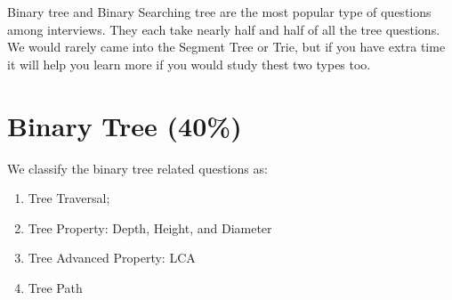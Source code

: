 \documentclass[../main.tex]{subfiles}
\begin{document}
Binary tree and Binary Searching tree are the most popular type of questions among interviews. They each take nearly half and half of all the tree questions. We would rarely came into the Segment Tree or Trie, but if you have extra time it will help you learn more if you would study thest two types too.  
\section{Binary Tree (40\%)}
We classify the binary tree related questions as:
\begin{enumerate}
    \item Tree Traversal;
    \item Tree Property: Depth, Height, and Diameter
    \item Tree Advanced Property: LCA 
    \item Tree Path
\end{enumerate}
\end{document}
